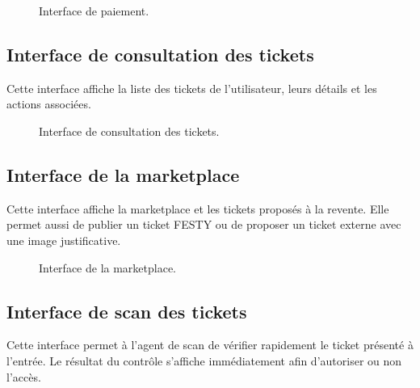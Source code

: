 \begin{figure}[H]
\centering
{}
\caption{Interface de paiement.}
\label{figure:6-6}
\end{figure}


\subsection{Interface de consultation des tickets}


Cette interface affiche la liste des tickets de l’utilisateur, leurs détails et les actions associées.


\begin{figure}[H]
\centering
{}
\caption{Interface de consultation des tickets.}
\label{figure:6-7}
\end{figure}


\subsection{Interface de la marketplace}


Cette interface affiche la marketplace et les tickets proposés à la revente. Elle permet aussi de publier un ticket FESTY ou de proposer un ticket externe avec une image justificative.


\begin{figure}[H]
\centering
{}
\caption{Interface de la marketplace.}
\label{figure:6-8}
\end{figure}


\subsection{Interface de scan des tickets}


Cette interface permet à l’agent de scan de vérifier rapidement le ticket présenté à l’entrée. Le résultat du contrôle s’affiche immédiatement afin d’autoriser ou non l’accès.


